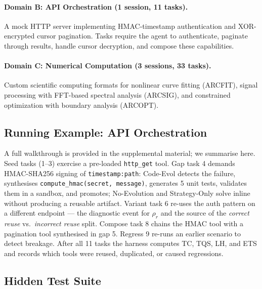 \documentclass[sigconf,anonymous,review,natbib=false]{acmart}
\begin{document}
\paragraph{Domain B: API Orchestration (1 session, 11 tasks).} A mock HTTP server implementing HMAC-timestamp authentication and XOR-encrypted cursor pagination. Tasks require the agent to authenticate, paginate through results, handle cursor decryption, and compose these capabilities.

\paragraph{Domain C: Numerical Computation (3 sessions, 33 tasks).} Custom scientific computing formats for nonlinear curve fitting (ARCFIT), signal processing with FFT-based spectral analysis (ARCSIG), and constrained optimization with boundary analysis (ARCOPT).

\subsection{Running Example: API Orchestration}

A full walkthrough is provided in the supplemental material; we summarise here. Seed tasks (1--3) exercise a pre-loaded \texttt{http\_get} tool. Gap task 4 demands HMAC-SHA256 signing of \texttt{timestamp:path}: Code-Evol detects the failure, synthesises \texttt{compute\_hmac(secret, message)}, generates 5 unit tests, validates them in a sandbox, and promotes; No-Evolution and Strategy-Only solve inline without producing a reusable artifact. Variant task 6 re-uses the auth pattern on a different endpoint --- the diagnostic event for $\rho_r$ and the source of the \emph{correct reuse} vs.\ \emph{incorrect reuse} split. Compose task 8 chains the HMAC tool with a pagination tool synthesised in gap 5. Regress 9 re-runs an earlier scenario to detect breakage. After all 11 tasks the harness computes TC, TQS, LH, and ETS and records which tools were reused, duplicated, or caused regressions.

\subsection{Hidden Test Suite}
\label{sec:hidden_tests}
\end{document}
